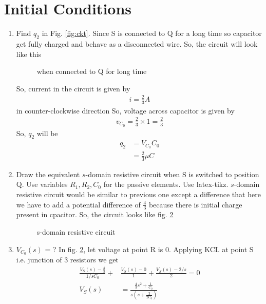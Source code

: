 \documentclass[journal,12pt,twocolumn]{IEEEtran}
\renewcommand\thesection{\arabic{section}}
\begin{document}
 \section{Initial Conditions}
\begin{enumerate}[label=\arabic*.,ref=\thesection.\theenumi]
\item Find $q_2$ in Fig. 
			\ref{fig:ckt}.
			\solution
			Since S is connected to Q for a long time so capacitor get fully charged and behave as a disconnected wire. So, the circuit will look like this
			
\begin{figure}[!ht]
	
	\centering
	\caption{when connected to Q for long time}
	\label{crct:3.1}
\end{figure}
		So, current in the circuit is given by
		\begin{align}
			i=\frac{2}{3}A
		\end{align}
		in counter-clockwise direction
		So, voltage across capacitor is given by
		\begin{align}
			v_{C_0}=\frac{2}{3}\times1=\frac{2}{3}
		\end{align}
		So, $q_2$ will be
		\begin{align}
			q_2&=V_{C_0}C_0\\
			&=\frac{2}{3}\mu C
		\end{align}
\item Draw the equivalent $s$-domain resistive circuit when S is switched to position Q.  Use variables $R_1, R_2, C_0$ for the passive elements.
Use latex-tikz.
		\label{prob:init}
		\solution $s$-domain resistive circuit would be similar to previous one except a difference that here we have to add a potential difference of $\frac{4}{3}$ because there is initial charge present in cpacitor.
		So, the circuit looks like fig. \ref{crct:3.2}
\begin{figure}[!ht]
	
	\centering
	\caption{s-domain resistive circuit}
	\label{crct:3.2}
\end{figure}
		\item $V_{C_0}(s)$ = ? 
			\solution In fig. \ref{crct:3.2}, let voltage at point R is 0. Applying KCL at point S i.e. junction of 3 resistors we get
		\begin{align}
			\frac{V_S(s)-\frac{4}{3}}{1/sC_0}+&\frac{V_S(s)-0}{1}+\frac{V_S(s)-2/s}{2}=0\\
			V_S(s)&=\frac{\frac{4}{3}s^2+\frac{1}{C_0}}{s(s+\frac{3}{2C_0})}
		\end{align}

\end{enumerate}
\end{document}
